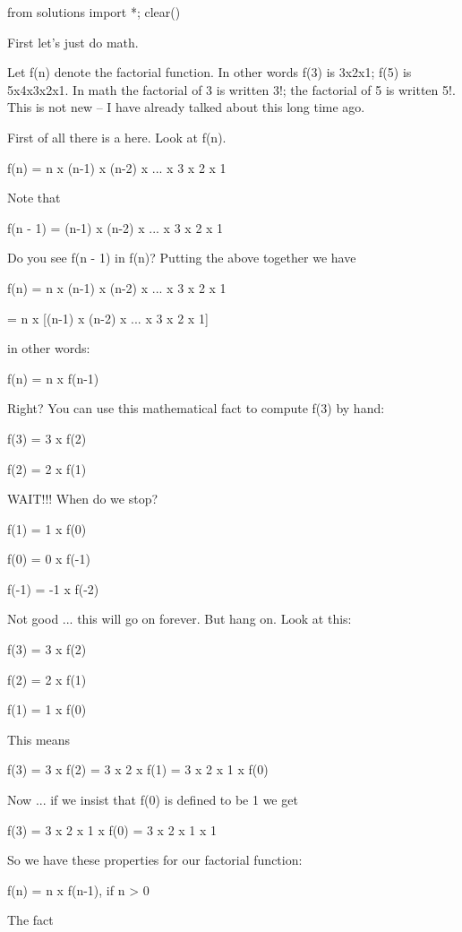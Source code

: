 \begin{python0}
from solutions import *; clear()
\end{python0}

First let's just do math.

Let f(n) denote the factorial function. In other words f(3) is 3x2x1;
f(5) is 5x4x3x2x1. In math the factorial of 3 is written 3!; the
factorial of 5 is written 5!. This is not new -- I have already talked
about this long time ago.

First of all there is a  here. Look at f(n).

f(n) = n x (n-1) x (n-2) x ... x 3 x 2 x 1

Note that

f(n - 1) = (n-1) x (n-2) x ... x 3 x 2 x 1

Do you see f(n - 1) in f(n)? Putting the above together we have

f(n) = n x (n-1) x (n-2) x ... x 3 x 2 x 1

= n x [(n-1) x (n-2) x ... x 3 x 2 x 1]

in other words:

f(n) = n x f(n-1)

Right? You can use this mathematical fact to compute f(3) by hand:

f(3) = 3 x f(2)

f(2) = 2 x f(1)

WAIT!!! When do we stop?

f(1) = 1 x f(0)

f(0) = 0 x f(-1)

f(-1) = -1 x f(-2)

Not good ... this will go on forever. But hang on. Look at this:

f(3) = 3 x f(2)

f(2) = 2 x f(1)

f(1) = 1 x f(0)

This means

f(3) = 3 x f(2) = 3 x 2 x f(1) = 3 x 2 x 1 x f(0)

Now ... if we insist that f(0) is defined to be 1 we get

f(3) = 3 x 2 x 1 x f(0) = 3 x 2 x 1 x 1

So we have these properties for our factorial function:

f(n) = n x f(n-1), if n > 0


The fact

